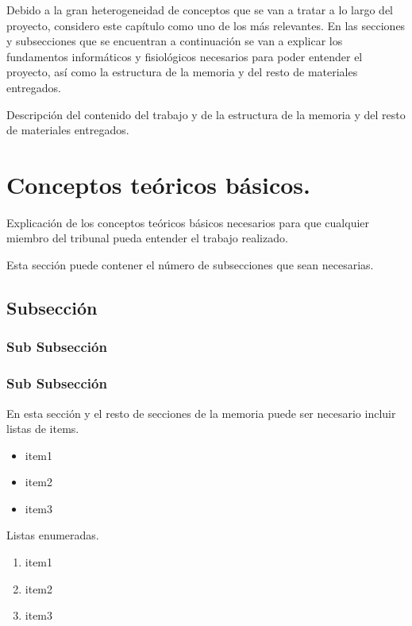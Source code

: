 
Debido a la gran heterogeneidad de conceptos que se van a tratar a lo largo del proyecto, considero este capítulo como uno de los más relevantes. En las secciones y subsecciones que se encuentran a continuación se van a explicar los fundamentos informáticos y fisiológicos necesarios para poder entender el proyecto, así como la estructura de la memoria y del resto de materiales entregados.

Descripción del contenido del trabajo y de la estructura de la memoria y del resto de materiales entregados.

\section{Conceptos teóricos básicos.}

Explicación de los conceptos teóricos básicos necesarios para que cualquier miembro del tribunal pueda entender el trabajo realizado.

Esta sección puede contener el número de subsecciones que sean necesarias.\cite{wiki:latex}

\subsection{Subsección}

\subsubsection{Sub Subsección}

\subsubsection{Sub Subsección}

En esta sección y el resto de secciones de la memoria puede ser necesario incluir listas de items.

\begin{itemize}
    \item item1
    \item item2
    \item item3
\end{itemize}

Listas enumeradas.

\begin{enumerate}
    \item item1
    \item item2
    \item item3
\end{enumerate}

